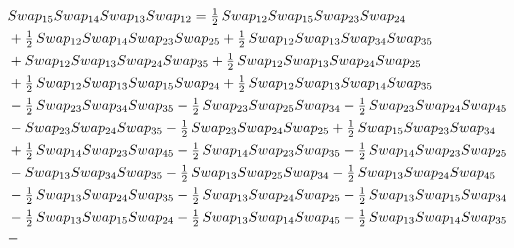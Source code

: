 \documentclass[10pt,a4paper]{amsart}
\begin{document}
\begin{align*}
    &\textnormal{Swap}_{15}   \textnormal{Swap}_{14}   \textnormal{Swap}_{13}   \textnormal{Swap}_{12} = 
    \tfrac12\,\textnormal{Swap}_{12} \textnormal{Swap}_{15} \textnormal{Swap}_{23} \textnormal{Swap}_{24} \\ &
    + \tfrac12\,\textnormal{Swap}_{12} \textnormal{Swap}_{14} \textnormal{Swap}_{23} \textnormal{Swap}_{25} 
     + \tfrac12\,\textnormal{Swap}_{12} \textnormal{Swap}_{13} \textnormal{Swap}_{34} \textnormal{Swap}_{35} \\ &
    + \textnormal{Swap}_{12} \textnormal{Swap}_{13} \textnormal{Swap}_{24} \textnormal{Swap}_{35} 
    + \tfrac12\,\textnormal{Swap}_{12} \textnormal{Swap}_{13} \textnormal{Swap}_{24} \textnormal{Swap}_{25} \\ &
     + \tfrac12\,\textnormal{Swap}_{12} \textnormal{Swap}_{13} \textnormal{Swap}_{15} \textnormal{Swap}_{24} 
    + \tfrac12\,\textnormal{Swap}_{12} \textnormal{Swap}_{13} \textnormal{Swap}_{14} \textnormal{Swap}_{35} \\ &
    - \tfrac12\,\textnormal{Swap}_{23} \textnormal{Swap}_{34} \textnormal{Swap}_{35} 
    - \tfrac12\,\textnormal{Swap}_{23} \textnormal{Swap}_{25} \textnormal{Swap}_{34} -
        \tfrac12\,\textnormal{Swap}_{23} \textnormal{Swap}_{24} \textnormal{Swap}_{45} \\ & - \textnormal{Swap}_{23} \textnormal{Swap}_{24} \textnormal{Swap}_{35}  - \tfrac12\,\textnormal{Swap}_{23} \textnormal{Swap}_{24} \textnormal{Swap}_{25} + \tfrac12\,\textnormal{Swap}_{15} \textnormal{Swap}_{23} \textnormal{Swap}_{34} \\ & +
        \tfrac12\,\textnormal{Swap}_{14} \textnormal{Swap}_{23} \textnormal{Swap}_{45} - \tfrac12\,\textnormal{Swap}_{14} \textnormal{Swap}_{23} \textnormal{Swap}_{35} - \tfrac12\,\textnormal{Swap}_{14} \textnormal{Swap}_{23} \textnormal{Swap}_{25}\\ &  - \textnormal{Swap}_{13} \textnormal{Swap}_{34} \textnormal{Swap}_{35}  -
        \tfrac12\,\textnormal{Swap}_{13} \textnormal{Swap}_{25} \textnormal{Swap}_{34} - \tfrac12\,\textnormal{Swap}_{13} \textnormal{Swap}_{24} \textnormal{Swap}_{45} \\ & - \tfrac12\,\textnormal{Swap}_{13} \textnormal{Swap}_{24} \textnormal{Swap}_{35}  - \tfrac12\,\textnormal{Swap}_{13} \textnormal{Swap}_{24} \textnormal{Swap}_{25} -
        \tfrac12\,\textnormal{Swap}_{13} \textnormal{Swap}_{15} \textnormal{Swap}_{34}\\ & - \tfrac12\,\textnormal{Swap}_{13} \textnormal{Swap}_{15} \textnormal{Swap}_{24}  - \tfrac12\,\textnormal{Swap}_{13} \textnormal{Swap}_{14} \textnormal{Swap}_{45} - \tfrac12\,\textnormal{Swap}_{13} \textnormal{Swap}_{14} \textnormal{Swap}_{35}\\ & -

\end{align*}
\end{document}
